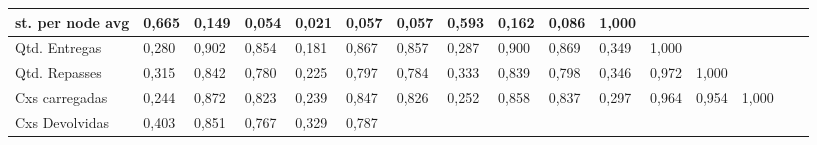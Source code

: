\begin{spacing}{1}
\begin{landscape}
\begin{table}[H]
\begin{tabular}{|p{2.8cm}|lllllllllllllll|}
        st. per node avg &
          \cellcolor[HTML]{56CB8B}0,665 &
          \cellcolor[HTML]{D9F4E5}0,149 &
          \cellcolor[HTML]{F2FBF6}0,054 &
          \cellcolor[HTML]{FAFEFC}0,021 &
          \cellcolor[HTML]{F1FBF6}0,057 &
          \cellcolor[HTML]{F1FBF6}0,057 &
          \cellcolor[HTML]{68D198}0,593 &
          \cellcolor[HTML]{D6F3E3}0,162 &
          \cellcolor[HTML]{EAF9F1}0,086 &
          \cellcolor[HTML]{00B050}1,000 &
           &
           &
           &
           &
           \\ \hline
        Qtd. Entregas &
          \cellcolor[HTML]{B8E9CF}0,280 &
          \cellcolor[HTML]{1AB862}0,902 &
          \cellcolor[HTML]{26BC6A}0,854 &
          \cellcolor[HTML]{D1F1E0}0,181 &
          \cellcolor[HTML]{22BB68}0,867 &
          \cellcolor[HTML]{25BC69}0,857 &
          \cellcolor[HTML]{B6E9CD}0,287 &
          \cellcolor[HTML]{1AB862}0,900 &
          \cellcolor[HTML]{22BB67}0,869 &
          \cellcolor[HTML]{A6E4C2}0,349 &
          \cellcolor[HTML]{00B050}1,000 &
           &
           &
           &
           \\ \hline
        Qtd. Repasses &
          \cellcolor[HTML]{AFE7C8}0,315 &
          \cellcolor[HTML]{29BD6C}0,842 &
          \cellcolor[HTML]{39C277}0,780 &
          \cellcolor[HTML]{C6EED8}0,225 &
          \cellcolor[HTML]{34C174}0,797 &
          \cellcolor[HTML]{37C276}0,784 &
          \cellcolor[HTML]{ABE5C6}0,333 &
          \cellcolor[HTML]{2ABD6D}0,839 &
          \cellcolor[HTML]{34C074}0,798 &
          \cellcolor[HTML]{A7E4C3}0,346 &
          \cellcolor[HTML]{08B355}0,972 &
          \cellcolor[HTML]{00B050}1,000 &
           &
           &
           \\ \hline
        Cxs carregadas &
          \cellcolor[HTML]{C1ECD5}0,244 &
          \cellcolor[HTML]{21BB67}0,872 &
          \cellcolor[HTML]{2EBF70}0,823 &
          \cellcolor[HTML]{C2EDD6}0,239 &
          \cellcolor[HTML]{28BD6B}0,847 &
          \cellcolor[HTML]{2DBE6F}0,826 &
          \cellcolor[HTML]{BFECD3}0,252 &
          \cellcolor[HTML]{25BC69}0,858 &
          \cellcolor[HTML]{2ABD6D}0,837 &
          \cellcolor[HTML]{B4E8CB}0,297 &
          \cellcolor[HTML]{0AB357}0,964 &
          \cellcolor[HTML]{0CB459}0,954 &
          \cellcolor[HTML]{00B050}1,000 &
           &
           \\ \hline
        Cxs Devolvidas &
          \cellcolor[HTML]{99E0B9}0,403 &
          \cellcolor[HTML]{27BC6B}0,851 &
          \cellcolor[HTML]{3CC379}0,767 &
          \cellcolor[HTML]{ACE6C6}0,329 &
          \cellcolor[HTML]{37C176}0,787 &

\end{tabular}
\end{table}
\end{landscape}
\end{spacing}
